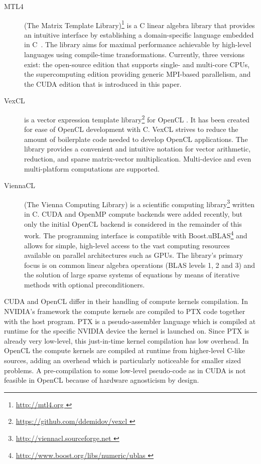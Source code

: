 \documentclass[final]{siamltex}
\newcommand{\addpp}[1]{{#1\nolinebreak[4]\hspace{-.05em}\raisebox{.4ex}{\tiny\bf ++}}\xspace}
\newcommand{\Cpp}{\addpp{C}}
\begin{document}
\begin{description}
    \item[MTL4] (The Matrix Template Library)\footnote{ \href{ http://mtl4.org }{
        http://mtl4.org }} is a \Cpp linear algebra library that provides
        an intuitive interface by establishing a domain-specific language
        embedded in \Cpp~\cite{pg_ccgrid12}.
        The library aims for maximal performance achievable by high-level languages
        using compile-time transformations.
        Currently, three versions exist: the open-source edition that supports
        single- and multi-core CPUs, the supercomputing edition providing
        generic MPI-based parallelism, and the CUDA edition that is introduced
        in this paper.
    \item[VexCL] is a vector expression template
        library\footnote{ \href{ https://github.com/ddemidov/vexcl }{
        https://github.com/ddemidov/vexcl }} for OpenCL \cite{VexCLRef}. It has
        been created for ease of OpenCL development with \Cpp.  VexCL strives to
        reduce the amount of boilerplate code needed to develop OpenCL
        applications. The library provides a convenient and intuitive notation
        for vector arithmetic, reduction, and sparse matrix-vector
        multiplication.  Multi-device and even multi-platform computations are
        supported.
    \item[ViennaCL] (The Vienna Computing Library) is a scientific computing
        library\footnote{ \href{ http://viennacl.sourceforge.net }{
        http://viennacl.sourceforge.net }} written in \Cpp \cite{ViennaCLRef}.
        CUDA and OpenMP compute backends were added recently, but
        only the initial OpenCL backend is considered in the remainder of this work.
        The programming interface is compatible with
        Boost.uBLAS\footnote{ \href{ http://www.boost.org/libs/numeric/ublas }
        { http://www.boost.org/libs/numeric/ublas } }
        and allows for simple, high-level access to the vast
        computing resources available on parallel architectures such as GPUs.
        The library's primary focus is on common linear algebra operations (BLAS
        levels 1, 2 and 3) and the solution of large sparse systems of equations by
        means of iterative methods with optional preconditioners.
\end{description}

CUDA and OpenCL differ in their handling of compute kernels compilation. In
NVIDIA's framework the compute kernels are compiled to PTX code together with
the host program. PTX is a pseudo-assembler language which is compiled at
runtime for the specific NVIDIA device the kernel is launched on. Since PTX is
already very low-level, this just-in-time kernel compilation has low overhead.
In OpenCL the compute kernels are compiled at runtime from higher-level C-like
sources, adding an overhead which is particularly noticeable for smaller
sized problems. A pre-compilation to some low-level pseudo-code as in CUDA is
not feasible in OpenCL because of hardware agnosticism by design.
\end{document}

